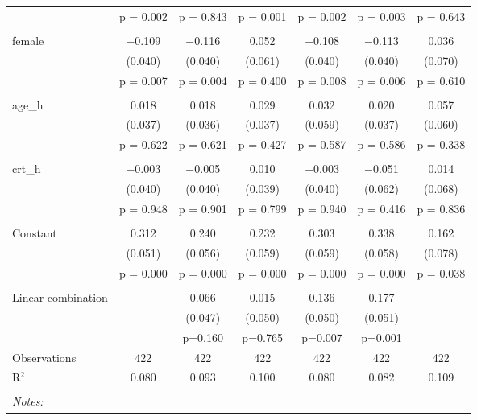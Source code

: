 \begin{table}[!htbp]
\begin{tabular}{@{\extracolsep{5pt}}lcccccc}
  & p = 0.002 & p = 0.843 & p = 0.001 & p = 0.002 & p = 0.003 & p = 0.643 \\ 
  & & & & & & \\ 
 female & $-$0.109 & $-$0.116 & 0.052 & $-$0.108 & $-$0.113 & 0.036 \\ 
  & (0.040) & (0.040) & (0.061) & (0.040) & (0.040) & (0.070) \\ 
  & p = 0.007 & p = 0.004 & p = 0.400 & p = 0.008 & p = 0.006 & p = 0.610 \\ 
  & & & & & & \\ 
 age\_h & 0.018 & 0.018 & 0.029 & 0.032 & 0.020 & 0.057 \\ 
  & (0.037) & (0.036) & (0.037) & (0.059) & (0.037) & (0.060) \\ 
  & p = 0.622 & p = 0.621 & p = 0.427 & p = 0.587 & p = 0.586 & p = 0.338 \\ 
  & & & & & & \\ 
 crt\_h & $-$0.003 & $-$0.005 & 0.010 & $-$0.003 & $-$0.051 & 0.014 \\ 
  & (0.040) & (0.040) & (0.039) & (0.040) & (0.062) & (0.068) \\ 
  & p = 0.948 & p = 0.901 & p = 0.799 & p = 0.940 & p = 0.416 & p = 0.836 \\ 
  & & & & & & \\ 
 Constant & 0.312 & 0.240 & 0.232 & 0.303 & 0.338 & 0.162 \\ 
  & (0.051) & (0.056) & (0.059) & (0.059) & (0.058) & (0.078) \\ 
  & p = 0.000 & p = 0.000 & p = 0.000 & p = 0.000 & p = 0.000 & p = 0.038 \\ 
  & & & & & & \\ 
Linear combination &   & 0.066 & 0.015 & 0.136 & 0.177 &  \\ 
 &  & (0.047) & (0.050) & (0.050) & (0.051) &  \\ 
 &  & p=0.160 & p=0.765 & p=0.007 & p=0.001 &  \\ 
Observations & 422 & 422 & 422 & 422 & 422 & 422 \\ 
R$^{2}$ & 0.080 & 0.093 & 0.100 & 0.080 & 0.082 & 0.109 \\ 
\hline \\[-1.8ex] 
\textit{Notes:} & \multicolumn{6}{l}{} \\ 
\end{tabular} 
\end{table}  
